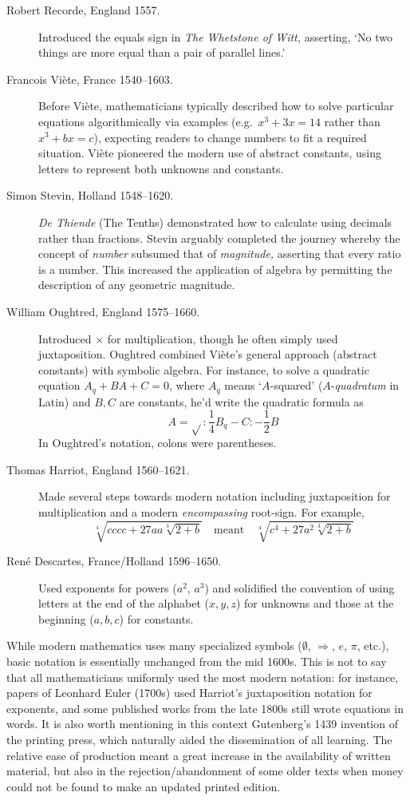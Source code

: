 \begin{description}
	\item[Robert Recorde, England 1557.] Introduced the equals sign in \emph{The Whetstone of Witt,}	asserting, `No two things are more equal than a pair of parallel lines.'
	
	\item[Francois Viète, France 1540--1603.] Before Viète, mathematicians typically described how to solve particular equations algorithmically via examples (e.g.\ $x^3+3x=14$ rather than $x^3+bx=c$), expecting readers to change numbers to fit a required situation. Viète pioneered the modern use of abstract constants, using letters to represent both unknowns and constants.
	
	\item[Simon Stevin, Holland 1548--1620.] \emph{De Thiende} (The Tenths) demonstrated how to calculate using decimals rather than fractions. Stevin arguably completed the journey whereby the concept of \emph{number} subsumed that of \emph{magnitude,} asserting that every ratio is a number. This increased the application of algebra by permitting the description of any geometric magnitude.
		
	\item[William Oughtred, England 1575--1660.] Introduced $\times$ for multiplication, though he often simply used juxtaposition. Oughtred combined Viète's general approach (abstract constants) with symbolic algebra. For instance, to solve a quadratic equation $A_q+BA+C=0$, where $A_q$ means `$A$-squared' ($A$-\emph{quadratum} in Latin) and $B,C$ are constants, he'd write the quadratic formula as
	\[
		A=\sqrt{} :\frac 14B_q-C:-\frac 12B
	\]
	In Oughtred's notation, colons were parentheses.
	
	\item[Thomas Harriot, England 1560--1621.] Made several steps towards modern notation including juxtaposition for multiplication and a modern \emph{encompassing} root-sign. For example, 
	\[\sqrt[4]{cccc+27aa\sqrt[3]{2+b}}\quad\text{meant}\quad \sqrt[4]{c^4+27a^2\sqrt[3]{2+b}}\]
	
	\item[René Descartes, France/Holland 1596--1650.] Used exponents for powers ($a^2$, $a^3$) and solidified the convention of using letters at the end of the alphabet ($x,y,z$) for unknowns and those at the beginning ($a,b,c$) for constants.
\end{description}


While modern mathematics uses many specialized symbols ($\emptyset$, $\Rightarrow$, $e$, $\pi$, etc.), basic notation is essentially unchanged from the mid 1600s. This is not to say that all mathematicians uniformly used the most modern notation: for instance, papers of Leonhard Euler (1700s) used Harriot's juxtaposition notation for exponents, and some published works from the late 1800s still wrote equations in words.\smallbreak
It is also worth mentioning in this context Gutenberg's 1439 invention of the printing press, which naturally aided the dissemination of all learning. The relative ease of production meant a great increase in the availability of written material, but also in the rejection/abandonment of some older texts when money could not be found to make an updated printed edition.


